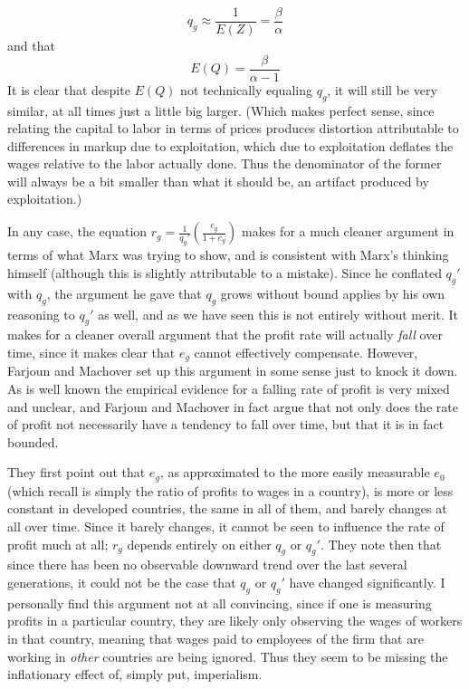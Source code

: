 \documentclass{article}
\theoremstyle{definition}
\theoremstyle{plain}
\theoremstyle{theorem}
\begin{document}
\[ q_g \approx \frac{1}{E(Z)} = \frac{\beta}{\alpha} \]
and that
\[E(Q) = \frac{\beta}{\alpha-1} \]
It is clear that despite $E(Q)$ not technically equaling $q_g$, it will still be very similar, at all times just a little big larger. (Which makes perfect sense, since relating the capital to labor in terms of prices produces distortion attributable to differences in markup due to exploitation, which due to exploitation deflates the wages relative to the labor actually done. Thus the denominator of the former will always be a bit smaller than what it should be, an artifact produced by exploitation.)  
\par In any case, the equation $r_g = \frac{1}{q_g'}\left(\frac{e_g}{1+e_g}\right)$ makes for a much cleaner argument in terms of what Marx was trying to show, and is consistent with Marx's thinking himself (although this is slightly attributable to a mistake). Since he conflated $q_g'$ with $q_g$, the argument he gave that $q_g$ grows without bound applies by his own reasoning to $q_g'$ as well, and as we have seen this is not entirely without merit. It makes for a cleaner overall argument that the profit rate will actually \textit{fall} over time, since it makes clear that $e_g$ cannot effectively compensate. However, Farjoun and Machover set up this argument in some sense just to knock it down. As is well known the empirical evidence for a falling rate of profit is very mixed and unclear, and Farjoun and Machover in fact argue that not only does the rate of profit not necessarily have a tendency to fall over time, but that it is in fact bounded. \par 
They first point out that $e_g$, as approximated to the more easily measurable $e_0$ (which recall is simply the ratio of profits to wages in a country), is more or less constant in developed countries, the same in all of them, and barely changes at all over time. Since it barely changes, it cannot be seen to influence the rate of profit much at all; $r_g$ depends entirely on either $q_g$ or $q_g'$. They note then that since there has been no observable downward trend over the last several generations, it could not be the case that $q_g$ or $q_g'$ have changed significantly. I personally find this argument not at all convincing, since if one is measuring profits in a particular country, they are likely only observing the wages of workers in that country, meaning that wages paid to employees of the firm that are working in \textit{other} countries are being ignored. Thus they seem to be missing the inflationary effect of, simply put, imperialism. \par 
\end{document}
